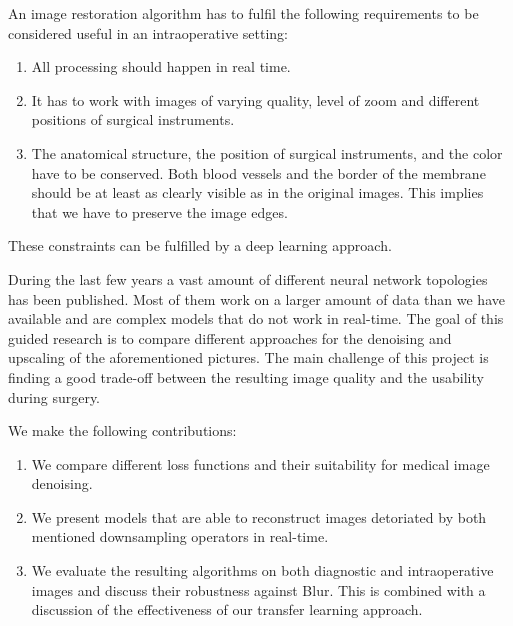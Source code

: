 \documentclass{scrartcl}
\begin{document}
An image restoration algorithm has to fulfil the following requirements to be considered useful in an intraoperative setting:
\begin{enumerate}
\item All processing should happen in real time.
\item It has to work with images of varying quality, level of zoom and different positions of surgical instruments.
\item The anatomical structure, the position of surgical instruments, and the color have to be conserved.
Both blood vessels and the border of the membrane should be at least as clearly visible as in the original images.
This implies that we have to preserve the image edges.
\end{enumerate}
These constraints can be fulfilled by a deep learning approach.

During the last few years a vast amount of different neural network topologies has been published.
Most of them work on a larger amount of data than we have available and are complex models that do not work in real-time.
The goal of this guided research is to compare different approaches for the denoising and upscaling of the aforementioned pictures.
The main challenge of this project is finding a good trade-off between the resulting image quality and the usability during surgery.

We make the following contributions:
\begin{enumerate}
\item We compare different loss functions and their suitability for medical image denoising.
\item We present models that are able to reconstruct images detoriated by both mentioned downsampling operators in real-time.
\item We evaluate the resulting algorithms on both diagnostic and intraoperative images and discuss their robustness against Blur.
  This is combined with a discussion of the effectiveness of our transfer learning approach.
\end{enumerate}

\end{document}
